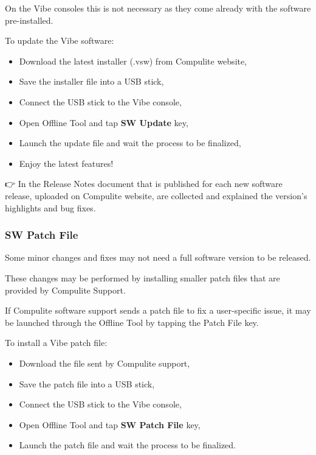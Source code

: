 \documentclass[
]{article}
\begin{document}
On the Vibe consoles this is not necessary as they come already with the software pre-installed.

To update the Vibe software:

\begin{itemize}
\item
  Download the latest installer (.vsw) from Compulite website,
\item
  Save the installer file into a USB stick,
\item
  Connect the USB stick to the Vibe console,
\item
  Open Offline Tool and tap \textbf{SW Update} key,
\item
  Launch the update file and wait the process to be finalized,
\item
  Enjoy the latest features!
\end{itemize}

👉 In the Release Notes document that is published for each new software release, uploaded on Compulite website, are collected and explained the version's highlights and bug fixes.

\hypertarget{sw-patch-file}{%
\subsubsection{SW Patch File}\label{sw-patch-file}}

Some minor changes and fixes may not need a full software version to be released.

These changes may be performed by installing smaller patch files that are provided by Compulite Support.

If Compulite software support sends a patch file to fix a user-specific issue, it may be launched through the Offline Tool by tapping the Patch File key.

To install a Vibe patch file:

\begin{itemize}
\item
  Download the file sent by Compulite support,
\item
  Save the patch file into a USB stick,
\item
  Connect the USB stick to the Vibe console,
\item
  Open Offline Tool and tap \textbf{SW Patch File} key,
\item
  Launch the patch file and wait the process to be finalized.
\end{itemize}
\end{document}
